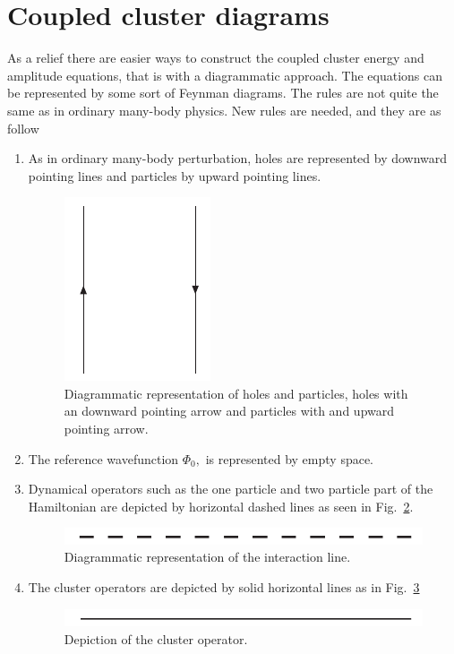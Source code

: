 \section{Coupled cluster diagrams}

As a relief there are easier ways to construct the coupled 
cluster energy and amplitude equations, that is with a diagrammatic
approach. The equations can be represented by some sort of Feynman
diagrams. The rules are not quite the same as in ordinary many-body
physics.
New rules are needed, and they are as follow
\begin{enumerate}
\item As in ordinary many-body perturbation, holes are represented 
by downward pointing lines and particles by upward pointing lines.

\begin{figure}[htp]
\centering
\includegraphics[scale=0.75]{holepart}
\caption{Diagrammatic representation of holes and particles, holes 
with an downward pointing arrow and particles with and upward pointing arrow.}
\label{holepart}
\end{figure}

\item The reference wavefunction $\Phi_0,$ is represented by empty
 space.

\item Dynamical operators such as the one particle and two particle
part of the Hamiltonian are depicted by horizontal dashed lines as seen in Fig.~\ref{intline}.
\begin{figure}[htp]
\centering
\includegraphics[scale=0.75]{interaction}
\caption{Diagrammatic representation of the interaction line.}
\label{intline}
\end{figure}

\item The cluster operators are depicted by solid horizontal lines as in Fig.~\ref{clusterline}
\begin{figure}[htp]
\centering
\includegraphics[scale=0.75]{cluster}
\caption{Depiction of the cluster operator.}
\label{clusterline}
\end{figure}



\end{enumerate}
